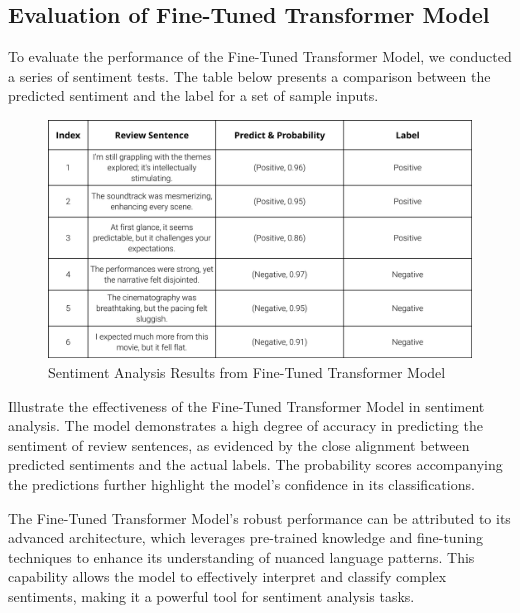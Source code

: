 \documentclass{article}
\begin{document}
\subsection{Evaluation of Fine-Tuned Transformer Model}
To evaluate the performance of the Fine-Tuned Transformer Model, we conducted a series of sentiment tests. The table below presents a comparison between the predicted sentiment and the label for a set of sample inputs.
\begin{figure}[H]
    \centering
    \includegraphics[width=\textwidth]{figs/transformer.png}
    \caption{Sentiment Analysis Results from Fine-Tuned Transformer Model}
    \label{fig:transformer-evaluation}
\end{figure}
Illustrate the effectiveness of the Fine-Tuned Transformer Model in sentiment analysis. The model demonstrates a high degree of accuracy in predicting the sentiment of review sentences, as evidenced by the close alignment between predicted sentiments and the actual labels. The probability scores accompanying the predictions further highlight the model's confidence in its classifications.

The Fine-Tuned Transformer Model's robust performance can be attributed to its advanced architecture, which leverages pre-trained knowledge and fine-tuning techniques to enhance its understanding of nuanced language patterns. This capability allows the model to effectively interpret and classify complex sentiments, making it a powerful tool for sentiment analysis tasks.
\end{document}
